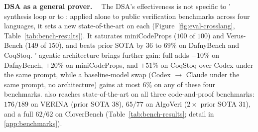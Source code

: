\textbf{DSA as a general prover. \ }
The DSA's effectiveness is not specific to \sys{}' synthesis loop or to \coq{}: 
applied alone to public verification benchmarks across four languages, it sets a new state-of-the-art on each (Figure~\ref{fig:eval-crosslang}, Table~\ref{tab:bench-results}).
It saturates miniCodeProps ($100$ of $100$) and Verus-Bench ($149$ of $150$), and beats prior SOTA by $36$ to $69\%$ on DafnyBench and CoqStoq. 
% 
\sys{}' agentic architecture brings further gain:
full \sys{} adds $+10\%$ on DafnyBench, $+20\%$ on miniCodeProps, and $+51\%$ on CoqStoq over Codex under the same prompt, while a baseline-model swap (Codex $\to$ Claude under the same prompt, no \sys{} architecture) gains at most $6\%$ on any of these four benchmarks. 
% 
\sys{} also reaches state-of-the-art on all three code-and-proof benchmarks: $176/189$ on VERINA (prior SOTA $38$), $65/77$ on AlgoVeri ($2\times$ prior SOTA $31$), and a full $62/62$ on CloverBench (Table~\ref{tab:bench-results}; detail in \cref{app:benchmarks}).


